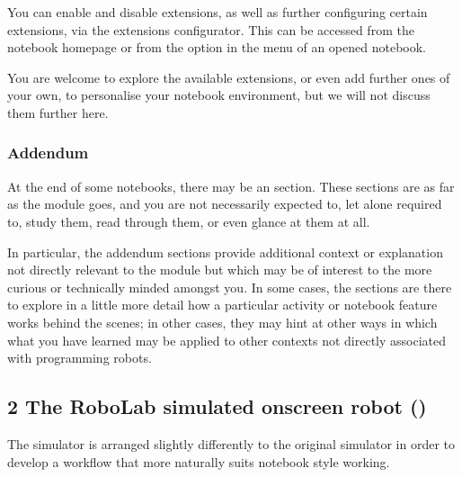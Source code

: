 \documentclass[letterpaper,10pt,english]{sphinxmanual}
\let\sphinxpxdimen\pdfpxdimen\else\newdimen\sphinxpxdimen
\begin{document}
You can enable and disable extensions, as well as further configuring certain extensions, via the extensions configurator. This can be accessed from the notebook homepage or from the  option in the  menu of an opened notebook.

\sphinxincludegraphics[width=1858\sphinxpxdimen,height=1440\sphinxpxdimen]{{00_01_nbextension_config}.png}

You are welcome to explore the available extensions, or even add further ones of your own, to personalise your notebook environment, but we will not discuss them further here.



\subsubsection{Addendum}
\label{\detokenize{content/00_SOFTWARE_GUIDE/Section_00_01_Jupyter_environment:Addendum}}
At the end of some notebooks, there may be an  section. These sections are  as far as the module goes, and you are not necessarily expected to, let alone required to, study them, read through them, or even glance at them at all.

In particular, the addendum sections provide additional context or explanation not directly relevant to the module but which may be of interest to the more curious or technically minded amongst you. In some cases, the sections are there to explore in a little more detail how a particular activity or notebook feature works behind the scenes; in other cases, they may hint at other ways in which what you have learned may be applied to other contexts not directly associated with programming robots.


\subsection{2 The RoboLab simulated on\sphinxhyphen{}screen robot ()}
\label{\detokenize{content/00_SOFTWARE_GUIDE/Section_00_02-nb3devsim:2-The-RoboLab-simulated-on-screen-robot-(nbev3devsim)}}\label{\detokenize{content/00_SOFTWARE_GUIDE/Section_00_02-nb3devsim::doc}}
The  simulator is arranged slightly differently to the original  simulator in order to develop a workflow that more naturally suits notebook style working.
\end{document}
